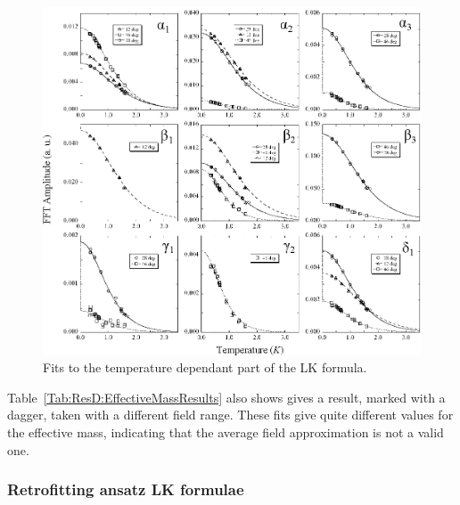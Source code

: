 \begin{figure}[htbp]
    \begin{center}
        \includegraphics[scale=0.9]{Chapter-dHvABaFe2P2/Figures/Mass/SimpleLKFits/SimpleLKFits}
        \caption{Fits to the temperature dependant part of the \ac{LK} formula. }
        \label{Fig:ResD:SimpleLKFits}
    \end{center}
\end{figure}
Table~\ref{Tab:ResD:EffectiveMassResults} also shows gives a result, marked with a dagger, taken with a different field range. These fits give quite different values for the effective mass, indicating that the average field approximation is not a valid one.

\subsubsection{Retrofitting ansatz \ac{LK} formulae}

